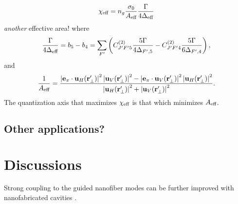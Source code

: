\documentclass[preprint,aps,pra,onecolumn]{revtex4-1} %
\newcommand{\comment}[1]{{\color{Maroon} #1}}
\begin{document}
\begin{equation}
\chi_{\text{eff}} = n_g\frac{\sigma_0}{A_{\text{eff}}} \frac{\Gamma}{4\Delta_{\text{eff}}}
\end{equation}
\comment{\emph{another} effective area!} where
\begin{equation} 
\frac{\Gamma}{4\Delta_{\text{eff}}} = b_5 - b_4 = \sum_{F'}  \left( C^{(2)}_{J'F'5}\frac{5\Gamma}{4\Delta_{F',5}} -  C^{(2)}_{J'F'4}\frac{5\Gamma}{6 \Delta_{F',4} } \right),
\end{equation}
and 
\begin{equation}
\frac{1}{A_{\text{eff}}} = \frac{\left|\mathbf{e}_\pi \cdot \mathbf{u}_H(\mathbf{r}'_\perp)\right|^2 \left|\mathbf{u}_V(\mathbf{r}'_\perp)\right|^2 - 
\left|\mathbf{e}_\pi \cdot \mathbf{u}_V(\mathbf{r}'_\perp)\right|^2 \left|\mathbf{u}_H(\mathbf{r}'_\perp)\right|^2}
{ \left|\mathbf{u}_H(\mathbf{r}'_\perp)\right|^2 +\left|\mathbf{u}_V(\mathbf{r}'_\perp)\right|^2 }.
\end{equation}
The quantization axis that maximizes $\chi_{\text{eff}}$ is that which minimizes $A_{\text{eff}}$.




\subsection{Other applications?} 


\section{Discussions}

Strong coupling to the guided nanofiber modes can be further improved with nanofabricated cavities \cite{yalla_cavity_2014}.  


%
%


%	
%	
\end{document}
